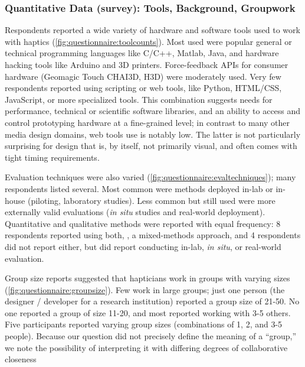 \subsubsection{Quantitative Data (survey): Tools, Background, Groupwork}
%
\noindent
Respondents reported a wide variety of hardware and software tools used to work with haptics (\autoref{fig:questionnaire:toolcounts}).
Most used were popular general or technical programming languages like C/C++, Matlab, Java, and hardware hacking tools like Arduino and 3D printers.
Force-feedback APIs for consumer hardware (Geomagic Touch CHAI3D, H3D) were moderately used.
Very few respondents reported using scripting or web tools, like Python, HTML/CSS, JavaScript, or more specialized tools.
This combination suggests needs for  performance, technical or scientific software libraries, and an ability to access and control prototyping hardware at a fine-grained level; %
in contrast to many other media design domains, web tools use is notably low. 
The latter is not particularly surprising for design that is, by itself, not primarily visual, and often comes with tight timing requirements. %

Evaluation techniques were also varied (\autoref{fig:questionnaire:evaltechniques}); 
many respondents listed several.
Most common were methods deployed in-lab or in-house (piloting, laboratory studies).
Less common but still used were more externally valid evaluations (\emph{in situ} studies and real-world deployment).
Quantitative and qualitative methods were reported with equal frequency: 8 respondents reported using both, \ie, a mixed-methods approach, and 4 respondents did not report either, but did report conducting in-lab, \emph{in situ}, or real-world evaluation.


Group size reports suggested that hapticians work in groups with varying sizes (\autoref{fig:questionnaire:groupsize}).
Few work in large groups; just one person (the designer / developer for a research institution) reported a group size of 21-50. No one reported a group of size 11-20,
and most reported working with 3-5 others.
Five participants reported varying group sizes (combinations of 1, 2, and 3-5 people).
Because our question did not precisely define the meaning of a ``group,'' we note the possibility of interpreting it with differing degrees of collaborative closeness %

